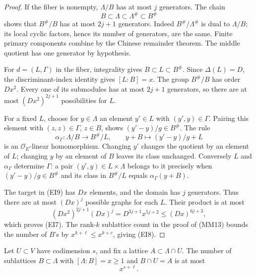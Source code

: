 \begin{proof}
If the fiber is nonempty, \(\Lambda/B\) has at most \(j\)
generators.  The chain
\[
              B\subset\Lambda\subset\Lambda^\#\subset B^\#
\]
shows that \(B^\#/B\) has at most \(2j+1\) generators.
Indeed \(B^\#/\Lambda^\#\) is dual to \(\Lambda/B\);
its local cyclic factors, hence its number of generators,
are the same.  Finite primary components combine by the
Chinese remainder theorem.  The middle quotient has one
generator by hypothesis.

For \(d=(L,\Gamma)\) in the fiber, integrality gives
\(B\subset L\subset B^\#\).  Since \(\Delta(L)=D\),
the discriminant-index identity gives \([L:B]=x\).
The group \(B^\#/B\) has order \(Dx^2\).  Every one of
its submodules has at most \(2j+1\) generators, so there
are at most \((Dx^2)^{2j+1}\) possibilities for \(L\).

For a fixed \(L\), choose for \(y\in\Lambda\) an element
\(y'\in L\) with \((y',y)\in\Gamma\).  Pairing this
element with \((z,z)\in\Gamma\), \(z\in B\), shows
\((y'-y)/g\in B^\#\).  The rule
\[
 \alpha_\Gamma:\Lambda/B\longrightarrow B^\#/L,\qquad
        y+B\longmapsto (y'-y)/g+L
 \tag{EI9}
\]
is an \(\mathcal O_E\)-linear homomorphism.  Changing
\(y'\) changes the quotient by an element of \(L\);
changing \(y\) by an element of \(B\) leaves its class
unchanged.  Conversely \(L\) and \(\alpha_\Gamma\)
determine \(\Gamma\): a pair \((y',y)\in L\times\Lambda\)
belongs to it precisely when \((y'-y)/g\in B^\#\) and
its class in \(B^\#/L\) equals \(\alpha_\Gamma(y+B)\).

The target in (EI9) has \(Dx\) elements, and the domain
has \(j\) generators.  Thus there are at most
\((Dx)^j\) possible graphs for each \(L\).  Their product
is at most
\[
 (Dx^2)^{2j+1}(Dx)^j
       =D^{3j+1}x^{5j+2}\leq(Dx)^{6j+3},
\]
which proves (EI7).  The rank-\(k\) sublattice count in
the proof of (MM13) bounds the number of \(B\)'s by
\(x^{k+\ell}\leq x^{k+c}\), giving (EI8).
\end{proof}

\begin{lemma}
\label{lem:sublattice-prescribed-intersection}
Let \(U\subset V\) have codimension \(s\), and fix
a lattice \(A\subset\Lambda\cap U\).  The number of
sublattices \(B\subset\Lambda\) with
\([\Lambda:B]=x\geq1\) and \(B\cap U=A\) is at most
\[
                              x^{s+\ell}.
 \tag{EI10}
\]
\end{lemma}

